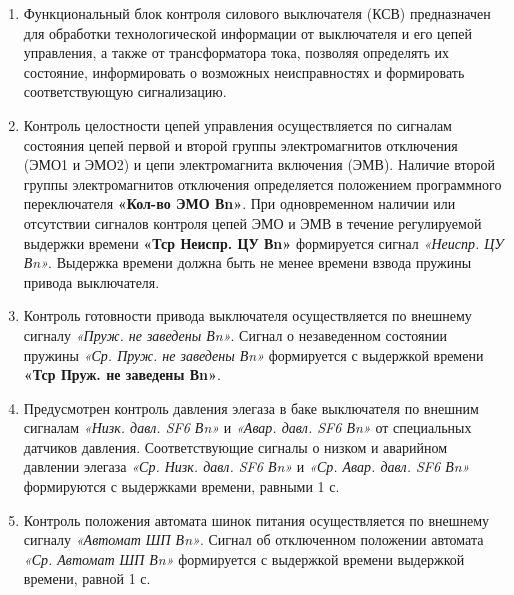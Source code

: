 \color{black}

\begin{enumerate}[label=\arabic{section}.\arabic{subsection}.\arabic{enumi}, labelsep=4pt, leftmargin=0pt, itemindent=57pt, itemsep=0pt, parsep=0pt] %

\item
Функциональный блок контроля силового выключателя (КСВ) предназначен для обработки технологической
информации от выключателя и его цепей управления, а также от трансформатора тока, позволяя определять их состояние,
информировать о возможных неисправностях и формировать соответствующую сигнализацию.

\item
Контроль целостности цепей управления осуществляется по сигналам состояния цепей первой и второй
группы электромагнитов отключения (ЭМО1 и ЭМО2) и цепи электромагнита включения (ЭМВ). Наличие второй
группы электромагнитов отключения определяется положением программного переключателя \textbf{«Кол-во ЭМО
Вn»}. При одновременном наличии или отсутствии сигналов контроля цепей ЭМО и ЭМВ в течение
регулируемой выдержки времени \textbf{«Тср Неиспр. ЦУ Вn»} формируется сигнал \textit{«Неиспр. ЦУ Вn»}. Выдержка
времени должна быть не менее времени взвода пружины привода выключателя.

\item
Контроль готовности привода выключателя осуществляется по внешнему сигналу \textit{«Пруж.
не заведены Вn»}. Сигнал о незаведенном состоянии пружины \textit{«Ср. Пруж. не заведены Вn»} формируется с выдержкой
времени \textbf{«Тср Пруж. не заведены Вn»}. 

\item
Предусмотрен контроль давления элегаза в баке выключателя по внешним сигналам \textit{«Низк. давл. SF6
Вn»} и \textit{«Авар. давл. SF6 Вn»} от специальных датчиков давления. Соответствующие сигналы о низком и
аварийном давлении элегаза \textit{«Ср. Низк. давл. SF6 Вn»} и \textit{«Ср. Авар. давл. SF6 Вn»} формируются с выдержками
времени, равными 1 с.

\item
Контроль положения автомата шинок питания осуществляется по внешнему сигналу \textit{«Автомат ШП Вn»}.
Сигнал об отключенном положении автомата \textit{«Ср. Автомат ШП Вn»} формируется с выдержкой времени выдержкой времени,
равной 1 с. 


\end{enumerate}
